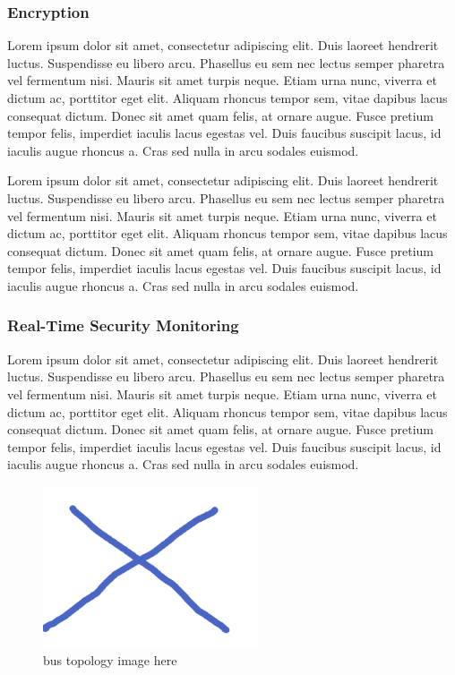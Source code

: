 \documentclass[final,conference,11pt]{IEEEtran}
\begin{document}
\subsubsection{Encryption}
Lorem ipsum dolor sit amet, consectetur adipiscing elit. Duis laoreet hendrerit luctus. Suspendisse eu libero arcu. Phasellus eu sem nec lectus semper pharetra vel fermentum nisi. Mauris sit amet turpis neque. Etiam urna nunc, viverra et dictum ac, porttitor eget elit. Aliquam rhoncus tempor sem, vitae dapibus lacus consequat dictum. Donec sit amet quam felis, at ornare augue. Fusce pretium tempor felis, imperdiet iaculis lacus egestas vel. Duis faucibus suscipit lacus, id iaculis augue rhoncus a. Cras sed nulla in arcu sodales euismod.

Lorem ipsum dolor sit amet, consectetur adipiscing elit. Duis laoreet hendrerit luctus. Suspendisse eu libero arcu. Phasellus eu sem nec lectus semper pharetra vel fermentum nisi. Mauris sit amet turpis neque. Etiam urna nunc, viverra et dictum ac, porttitor eget elit. Aliquam rhoncus tempor sem, vitae dapibus lacus consequat dictum. Donec sit amet quam felis, at ornare augue. Fusce pretium tempor felis, imperdiet iaculis lacus egestas vel. Duis faucibus suscipit lacus, id iaculis augue rhoncus a. Cras sed nulla in arcu sodales euismod.

\subsubsection{Real-Time Security Monitoring}
Lorem ipsum dolor sit amet, consectetur adipiscing elit. Duis laoreet hendrerit luctus. Suspendisse eu libero arcu. Phasellus eu sem nec lectus semper pharetra vel fermentum nisi. Mauris sit amet turpis neque. Etiam urna nunc, viverra et dictum ac, porttitor eget elit. Aliquam rhoncus tempor sem, vitae dapibus lacus consequat dictum. Donec sit amet quam felis, at ornare augue. Fusce pretium tempor felis, imperdiet iaculis lacus egestas vel. Duis faucibus suscipit lacus, id iaculis augue rhoncus a. Cras sed nulla in arcu sodales euismod.

\begin{figure}[!t]
\centering
\includegraphics[width=2.5in]{topology}
\caption{bus topology image here}
\label{fig:monitor}
\end{figure}
\end{document}
